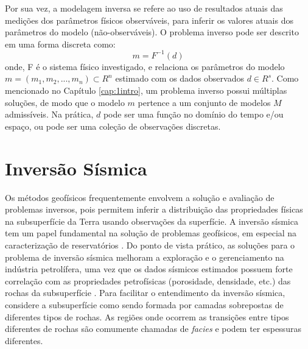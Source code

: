 Por sua vez, a modelagem inversa se refere ao uso de resultados atuais das medições dos parâmetros
físicos observáveis, para inferir os valores atuais dos parâmetros do modelo (não-observáveis).
O problema inverso pode ser descrito em uma forma discreta como:
\begin{equation}
\label{eq:deqgm}
m = F^{-1}(d)
\end{equation}
onde, F é o sistema físico investigado, e relaciona os parâmetros do modelo $m=(m_1, m_2,...,m_n) \subset R^n$
estimado com os dados observados $d \in R^s$.
Como mencionado no Capítulo \ref{cap:1intro}, um problema inverso possui múltiplas soluções,
de modo que o modelo $m$ pertence a um conjunto de modelos $M$ admissíveis.
Na prática, $d$ pode ser uma função no domínio do tempo e/ou espaço, ou pode ser
uma coleção de observações discretas.

\section{Inversão Sísmica}

Os métodos geofísicos frequentemente envolvem a solução e avaliação de problemas inversos,
pois permitem inferir a distribuição das propriedades físicas na subsuperfície da Terra
usando observações da superfície. A inversão sísmica tem um papel fundamental na solução 
de problemas geofísicos, em especial na caracterização de reservatórios \cite{Bosch2010} \cite{Srivastava2009}.
Do ponto de vista prático, as soluções para o problema de inversão sísmica melhoram a exploração e
o gerenciamento na indústria petrolífera, uma vez que os dados sísmicos estimados possuem forte correlação com as
propriedades petrofísicas (porosidade, densidade, etc.) das rochas da subsuperfície \cite{Figueiredo2014}.
Para facilitar o entendimento da inversão sísmica, considere a subsuperfície como sendo formada por camadas
sobrepostas de diferentes tipos de rochas. As regiões onde ocorrem as transições entre tipos
diferentes de rochas são comumente chamadas de \textit{facies} e podem ter espessuras diferentes.

